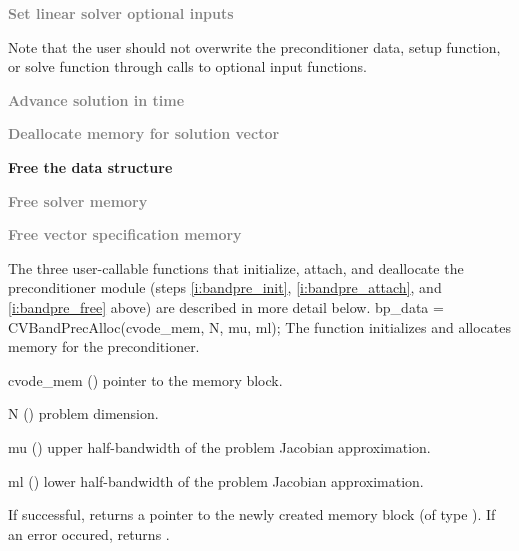 \begin{Steps}
\item
  \textcolor{gray}{\bf Set linear solver optional inputs}

  Note that the user should not overwrite the preconditioner data, setup function, 
  or solve function through calls to {\cvspgmr} optional input functions.

\item
  \textcolor{gray}{\bf Advance solution in time}

\item
  \textcolor{gray}{\bf Deallocate memory for solution vector}

\item \label{i:bandpre_free}
  {\bf Free the {\cvbandpre} data structure}


\item
  \textcolor{gray}{\bf Free solver memory}
  
\item
  \textcolor{gray}{\bf Free vector specification memory}

\end{Steps}
The three user-callable functions that initialize, attach, and deallocate
the {\cvbandpre} preconditioner module (steps \ref{i:bandpre_init},
\ref{i:bandpre_attach}, and \ref{i:bandpre_free} above) are described
in more detail below.
{
  bp\_data = CVBandPrecAlloc(cvode\_mem, N, mu, ml);
}
{
  The function  initializes and allocates
  memory for the {\cvbandpre} preconditioner.
}
{
  \begin{args}
  \item[cvode\_mem] ()
    pointer to the {\cvode} memory block.
  \item[N] ()
    problem dimension.
  \item[mu] ()
    upper half-bandwidth of the problem Jacobian approximation.
  \item[ml] ()
    lower half-bandwidth of the problem Jacobian approximation.
  \end{args}
}
{
  If successful,  returns a pointer to the newly created 
  {\cvbandpre} memory block (of type ).
  If an error occured,  returns .
}
